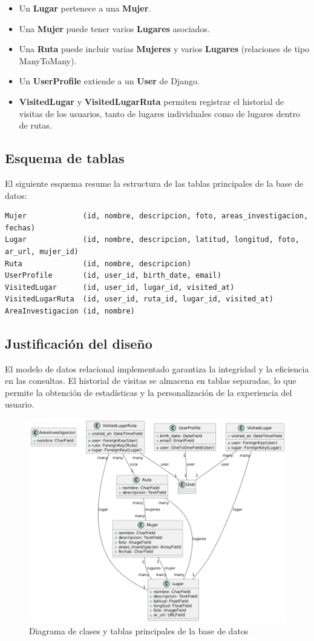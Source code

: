 \begin{itemize}
    \item Un \textbf{Lugar} pertenece a una \textbf{Mujer}.
    \item Una \textbf{Mujer} puede tener varios \textbf{Lugares} asociados.
    \item Una \textbf{Ruta} puede incluir varias \textbf{Mujeres} y varios \textbf{Lugares} (relaciones de tipo ManyToMany).
    \item Un \textbf{UserProfile} extiende a un \textbf{User} de Django.
    \item \textbf{VisitedLugar} y \textbf{VisitedLugarRuta} permiten registrar el historial de visitas de los usuarios, tanto de lugares individuales como de lugares dentro de rutas.
\end{itemize}

\subsection{Esquema de tablas}

El siguiente esquema resume la estructura de las tablas principales de la base de datos:

\begin{verbatim}
Mujer             (id, nombre, descripcion, foto, areas_investigacion, fechas)
Lugar             (id, nombre, descripcion, latitud, longitud, foto, ar_url, mujer_id)
Ruta              (id, nombre, descripcion)
UserProfile       (id, user_id, birth_date, email)
VisitedLugar      (id, user_id, lugar_id, visited_at)
VisitedLugarRuta  (id, user_id, ruta_id, lugar_id, visited_at)
AreaInvestigacion (id, nombre)
\end{verbatim}

\subsection{Justificación del diseño}

El modelo de datos relacional implementado garantiza la integridad y la eficiencia en las consultas. El historial de visitas se almacena en tablas separadas, lo que permite la obtención de estadísticas y la personalización de la experiencia del usuario.

\begin{figure}[H]
    \centering
    \includegraphics[width=1\textwidth]{figs/diagrama_clases.png}
    \caption{Diagrama de clases y tablas principales de la base de datos}
\end{figure}